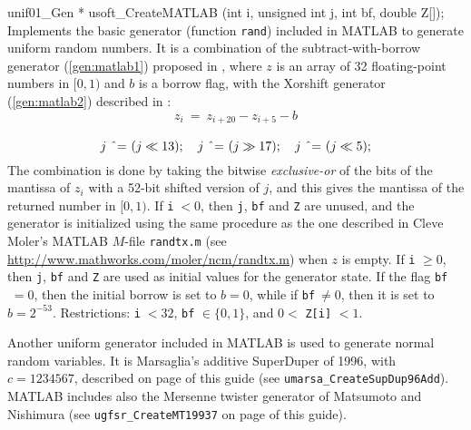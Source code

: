 {unif01_Gen * usoft_CreateMATLAB (int i, unsigned int j, int bf,
                                 double Z[]);
\endcode
  \tab Implements the basic generator  (function {\tt rand}) included in
 {\sc MATLAB} \cite{rMOL04a} to generate uniform random numbers.
  It is %
  a combination of the subtract-with-borrow generator
  (\ref{gen:matlab1}) proposed in \cite{rMAR91a}, where $z$ is an array of
 32 floating-point numbers in $[0, 1)$ and $b$ is a borrow flag, with the
  Xorshift generator (\ref{gen:matlab2}) described in \cite{rMAR03a}:
\begin{equation}
  z_i \  =\   z_{i+20} -  z_{i+5} - b \label{gen:matlab1}
\end{equation}
\begin{equation}
 \rule{0pt}{14pt} j \mbox{ \^{}= } (j\ll13);\quad  j \mbox{ \^{}= } (j\gg17);
   \quad  j \mbox{ \^{}= } (j\ll5); \label{gen:matlab2}
\end{equation}
  The  combination is done by taking the bitwise \emph{exclusive-or} of
  the bits of the mantissa of $z_i$ with a 52-bit shifted version
  of $j$, and this gives the mantissa of the returned number in $[0, 1)$.
  If \texttt{i}$\; <0$, then \texttt{j},  \texttt{bf}  and \texttt{Z}
  are unused, and the generator is initialized using the same
  procedure as the one described in Cleve Moler's MATLAB
  $M$-file \texttt{randtx.m}
  (see \url{http://www.mathworks.com/moler/ncm/randtx.m})
  when $z$ is empty. If \texttt{i} $\ge 0$, then \texttt{j},  \texttt{bf}
  and \texttt{Z} are used as initial values for the generator state.
  If the flag \texttt{bf}$\;=0$, then the initial
  borrow is set to $b=0$, while if \texttt{bf}$\ \ne 0$, then
   it is set to  $b=2^{-53}$.
   Restrictions: \texttt{i}$\; < 32$, \texttt{bf} $\in \{0, 1\}$,
    and $0 <$ \texttt{Z[i]} $ < 1$.

  Another uniform generator included in {\sc MATLAB} is used to
  generate normal random variables. It is
  Marsaglia's additive SuperDuper of 1996, with $c=1234567$, described on page
   \pageref{gen:SupDup96} of this guide (see {\tt umarsa\_CreateSupDup96Add}).
  {\sc MATLAB} includes also  the Mersenne twister generator
  of Matsumoto and Nishimura \cite{rMAT98a} (see {\tt ugfsr\_CreateMT19937}
  on page \pageref{rng:MT19937} of this guide).
  \endtab
\code


}

